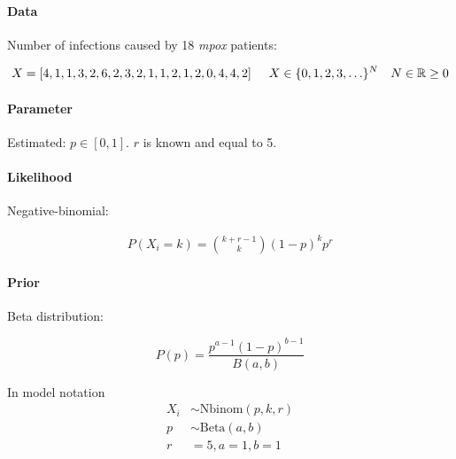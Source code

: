\paragraph{Data} Number of infections caused by 18 \textit{mpox} patients:  

\begin{align*}
    X = [4,1,1,3,2,6,2,3,2,1,1,2,1,2,0,4,4,2]  & \hspace{5mm} X \in \{0, 1, 2, 3, \ldots\}^N & N \in \mathbb{R} \geq 0
\end{align*}

\paragraph{Parameter} Estimated: $p \in [0,1]$. $r$ is known and equal to 5.
\paragraph{Likelihood} Negative-binomial:

\begin{align*}
    P(X_i=k) = {k + r - 1 \choose k} (1 - p)^k p^r
\end{align*}

\paragraph{Prior} Beta distribution:

\[
P(p) = \frac{p^{a-1} (1-p)^{b-1}}{B(a, b)}
\]




In model notation
\begin{align*}
    X_i &\sim \text{Nbinom}(p,k,r) \\
    p &\sim \text{Beta}(a, b) \\
    r &= 5, a = 1, b = 1  \\
\end{align*}


